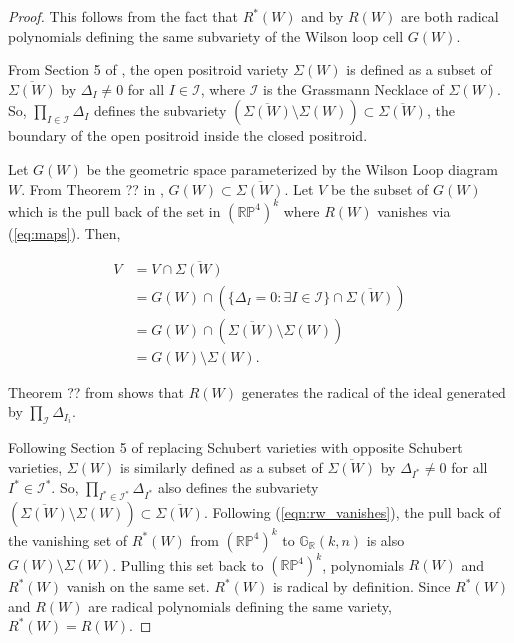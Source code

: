 \documentclass[11pt]{article}
\newcommand{\R}{\mathbb{R}}
\newcommand{\Grall}{\mathbb{G}_{\R}}
\theoremstyle{remark}
\theoremstyle{definition}
\begin{document}
\begin{proof}
This follows from the fact that $R^{\ast}(W)$ and by $R(W)$ are both radical polynomials defining the same subvariety of the Wilson loop cell $G(W)$. 

From Section 5 of \cite{knutsonlamspeyerjuggling}, the open positroid variety $\Sigma(W)$ is defined as a subset of $\overline{\Sigma(W)}$ by $\Delta_I \neq 0$ for all $I \in \mathcal{I}$, where $\mathcal{I}$ is the Grassmann Necklace of $\Sigma(W)$. So, $\prod_{I \in \mathcal{I}} \Delta_I$ defines the subvariety $(\overline{\Sigma(W)} \setminus \Sigma(W)) \subset \overline{\Sigma(W)}$, the boundary of the open positroid inside the closed positroid. 

Let $G(W)$ be the geometric space parameterized by the Wilson Loop diagram $W$. From Theorem ?? in \cite{basisshapeloc}, $G(W) \subset \overline{\Sigma(W)}$. Let $V$ be the subset of $G(W)$ which is the pull back of the set in $(\mathbb{RP}^{4})^{k}$ where $R(W)$ vanishes via (\ref{eq:maps}). Then,

%
\begin{equation} \label{eqn:rw_vanishes}
\begin{split}
V & = V \cap \overline{\Sigma(W)} \\
& = G(W) \cap (\{\Delta_I = 0 : \exists I \in \mathcal{I}\} \cap \overline{\Sigma(W)}) \\
& = G(W) \cap (\overline{\Sigma(W)} \setminus \Sigma(W)) \\
& = G(W) \setminus \Sigma(W).
\end{split}
\end{equation}

Theorem ?? from \cite{generalcombinatorics2} shows that $R(W)$ generates the radical of the ideal generated by $\prod_\mathcal{I} \Delta_{I_i}$.

Following Section 5 of \cite{knutsonlamspeyerjuggling} replacing Schubert varieties with opposite Schubert varieties, $\Sigma(W)$ is similarly defined as a subset of $\overline{\Sigma(W)}$ by $\Delta_{I^{\ast}} \neq 0$ for all $I^{\ast} \in \mathcal{I}^{\ast}$. So, $\prod_{I^{\ast} \in \mathcal{I}^{\ast}} \Delta_{I^{\ast}}$ also defines the subvariety $(\overline{\Sigma(W)} \setminus \Sigma(W)) \subset \overline{\Sigma(W)}$. Following (\ref{eqn:rw_vanishes}), the pull back of the vanishing set of $R^{\ast}(W)$ from $(\mathbb{RP}^4)^{k}$ to $\Grall(k,n)$ is also $G(W) \setminus \Sigma(W)$. Pulling this set back to $(\mathbb{RP}^4)^{k}$, polynomials $R(W)$ and $R^{\ast}(W)$ vanish on the same set. $R^{\ast}(W)$ is radical by definition. Since $R^{\ast}(W)$ and $R(W)$ are radical polynomials defining the same variety, $R^{\ast}(W) = R(W)$.
\end{proof}
\end{document}
